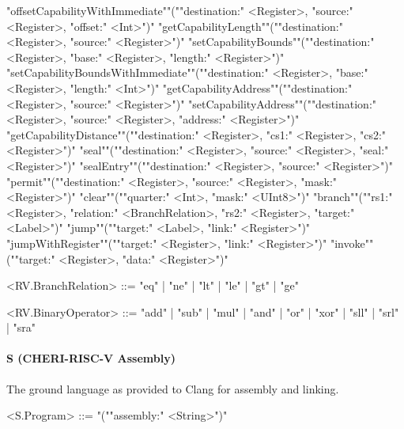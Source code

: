 \documentclass[main.tex]{subfiles}
\begin{document}
\begin{grammar}
						\alt "offsetCapabilityWithImmediate""(""destination:" <Register>, "source:" <Register>, "offset:" <Int>")"
						\alt "getCapabilityLength""(""destination:" <Register>, "source:" <Register>")"
						\alt "setCapabilityBounds""(""destination:" <Register>, "base:" <Register>, "length:" <Register>")"
						\alt "setCapabilityBoundsWithImmediate""(""destination:" <Register>, "base:" <Register>, "length:" <Int>")"
						\alt "getCapabilityAddress""(""destination:" <Register>, "source:" <Register>")"
						\alt "setCapabilityAddress""(""destination:" <Register>, "source:" <Register>, "address:" <Register>")"
						\alt "getCapabilityDistance""(""destination:" <Register>, "cs1:" <Register>, "cs2:" <Register>")"
						\alt "seal""(""destination:" <Register>, "source:" <Register>, "seal:" <Register>")"
						\alt "sealEntry""(""destination:" <Register>, "source:" <Register>")"
						\alt "permit""(""destination:" <Register>, "source:" <Register>, "mask:" <Register>")"
						\alt "clear""(""quarter:" <Int>, "mask:" <UInt8>")"
						\alt "branch""(""rs1:" <Register>, "relation:" <BranchRelation>, "rs2:" <Register>, "target:" <Label>")"
						\alt "jump""(""target:" <Label>, "link:" <Register>")"
						\alt "jumpWithRegister""(""target:" <Register>, "link:" <Register>")"
						\alt "invoke""(""target:" <Register>, "data:" <Register>")"
				\par
				<RV.BranchRelation> ::=
						"eq"
						| "ne"
						| "lt"
						| "le"
						| "gt"
						| "ge"
				\par
				<RV.BinaryOperator> ::=
						"add"
						| "sub"
						| "mul"
						| "and"
						| "or"
						| "xor"
						| "sll"
						| "srl"
						| "sra"
				\par
\end{grammar}
\par
\paragraph{ S (CHERI-RISC-V Assembly) } The ground language as provided to Clang for assembly and linking.
\begin{grammar}
	\footnotesize
				<S.Program> ::=
							"(""assembly:" <String>")"
				\par
\end{grammar}
\par

\biblio{}
\onlyinsubfile{\glsaddall\printglossaries}
\end{document}
